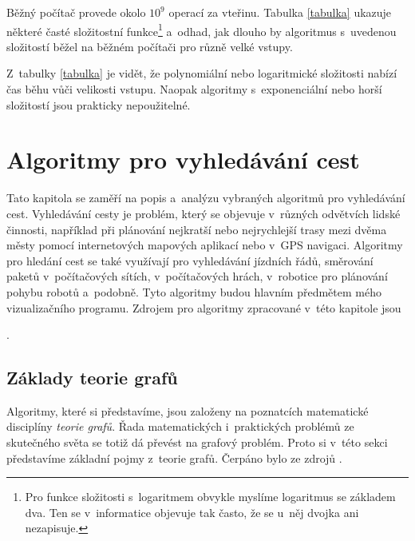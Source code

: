 \documentclass[12pt]{report}			%
\begin{document}
			Běžný počítač provede okolo $10^9$ operací za vteřinu. Tabulka \ref{tabulka} ukazuje některé časté složitostní funkce\footnote{Pro funkce složitosti s~logaritmem obvykle myslíme logaritmus se základem dva. Ten se v~informatice objevuje tak často, že se u~něj dvojka ani nezapisuje.} a~odhad, jak dlouho by algoritmus s~uvedenou složitostí běžel na běžném počítači pro různě velké vstupy. %
			\cite{cerny}
			
			Z~tabulky \ref{tabulka} je vidět, že polynomiální nebo logaritmické složitosti nabízí  čas běhu vůči velikosti vstupu. Naopak algoritmy s~exponenciální nebo horší složitostí jsou prakticky nepoužitelné. %
			
				
		\chapter{Algoritmy pro vyhledávání cest}
		Tato kapitola se zaměří na popis a~analýzu vybraných algoritmů pro vyhledávání cest. Vyhledávání cesty je problém, který se objevuje v~různých odvětvích lidské činnosti, například při plánování nejkratší nebo nejrychlejší trasy mezi dvěma městy pomocí internetových mapových aplikací nebo v~GPS navigaci. Algoritmy pro hledání cest se také využívají pro vyhledávání jízdních řádů, směrování paketů v~počítačových sítích, v~počítačových hrách, v~robotice pro plánování pohybu robotů a~podobně. Tyto algoritmy budou hlavním předmětem mého vizualizačního programu. Zdrojem pro algoritmy zpracované v~této kapitole jsou \cite{intro,pruvodce,cerny,garg,felner,uhlik,simic,carlos,patel_intro}
		
		.
		
			\section{Základy teorie grafů}
			Algoritmy, které si představíme, jsou založeny na  poznatcích matematické disciplíny \emph{teorie grafů}. Řada matematických i~praktických problémů ze skutečného světa se totiž dá převést na grafový problém. Proto si v~této sekci představíme základní pojmy z~teorie grafů. Čerpáno bylo ze zdrojů \cite{pruvodce} \cite{zaklady} \cite{intro} \cite{kovar}.
			
\end{document}
